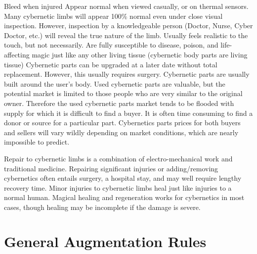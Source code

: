 \documentclass[twoside]{book}
\begin{document}
                Bleed when injured   
                  Appear normal when viewed casually, or on thermal
                 sensors. Many cybernetic limbs will appear 100\% normal
                 even under close visual inspection. However, inspection
                 by a knowledgeable person (Doctor, Nurse, Cyber Doctor,
                 etc.) will reveal the true nature of the limb. 
                  Usually feels realistic to the touch, but not
                 necessarily. 
                  Are fully susceptible to disease, poison, and
                 life-affecting magic just like any other living tissue
                 (cybernetic body parts are living tissue) 
                  Cybernetic parts can be upgraded at a later date
                 without total replacement. However, this usually
                 requires surgery. 
                  Cybernetic parts are usually built around the
                 user's body. Used cybernetic parts are valuable,
                 but the potential market is limited to those people who
                 are very similar to the original owner. Therefore the
                 used cybernetic parts market tends to be flooded with
                 supply for which it is difficult to find a buyer. It is
                 often time consuming to find a donor or source for a
                 particular part. Cybernetics parts prices for both
                 buyers and sellers will vary wildly depending on market
                 conditions, which are nearly impossible to predict.
                 
                  Repair to cybernetic limbs is a combination of
                 electro-mechanical work and traditional medicine.
                 Repairing significant injuries or adding/removing
                 cybernetics often entails surgery, a hospital stay, and
                 may well require lengthy recovery time. 
                  Minor injuries to cybernetic limbs heal just like
                 injuries to a normal human. Magical healing and
                 regeneration works for cybernetics in most cases, though
                 healing may be incomplete if the damage is severe.
                 
            
\section{General Augmentation Rules}
      
\end{document}
